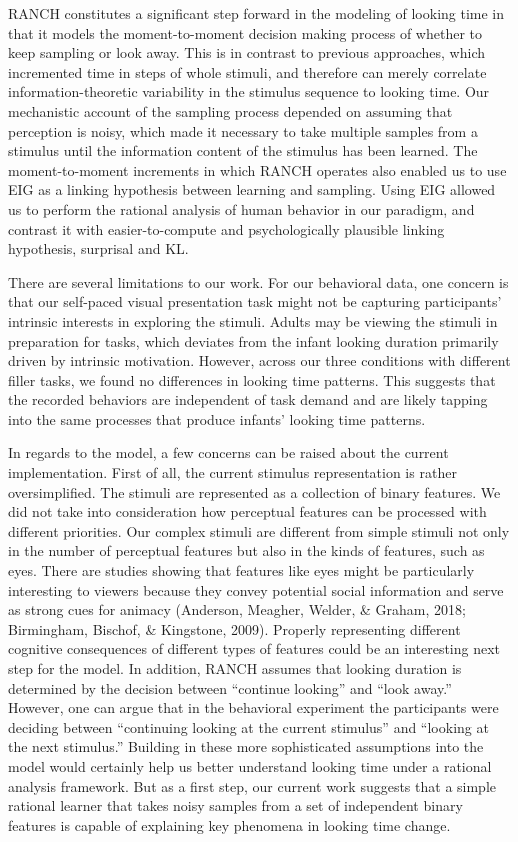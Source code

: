 \documentclass[10pt, letterpaper]{article}
\begin{document}
RANCH constitutes a significant step forward in the modeling of looking
time in that it models the moment-to-moment decision making process of
whether to keep sampling or look away. This is in contrast to previous
approaches, which incremented time in steps of whole stimuli, and
therefore can merely correlate information-theoretic variability in the
stimulus sequence to looking time. Our mechanistic account of the
sampling process depended on assuming that perception is noisy, which
made it necessary to take multiple samples from a stimulus until the
information content of the stimulus has been learned. The
moment-to-moment increments in which RANCH operates also enabled us to
use EIG as a linking hypothesis between learning and sampling. Using EIG
allowed us to perform the rational analysis of human behavior in our
paradigm, and contrast it with easier-to-compute and psychologically
plausible linking hypothesis, surprisal and KL.

There are several limitations to our work. For our behavioral data, one
concern is that our self-paced visual presentation task might not be
capturing participants' intrinsic interests in exploring the stimuli.
Adults may be viewing the stimuli in preparation for tasks, which
deviates from the infant looking duration primarily driven by intrinsic
motivation. However, across our three conditions with different filler
tasks, we found no differences in looking time patterns. This suggests
that the recorded behaviors are independent of task demand and are
likely tapping into the same processes that produce infants' looking
time patterns.

In regards to the model, a few concerns can be raised about the current
implementation. First of all, the current stimulus representation is
rather oversimplified. The stimuli are represented as a collection of
binary features. We did not take into consideration how perceptual
features can be processed with different priorities. Our complex stimuli
are different from simple stimuli not only in the number of perceptual
features but also in the kinds of features, such as eyes. There are
studies showing that features like eyes might be particularly
interesting to viewers because they convey potential social information
and serve as strong cues for animacy (Anderson, Meagher, Welder, \&
Graham, 2018; Birmingham, Bischof, \& Kingstone, 2009). Properly
representing different cognitive consequences of different types of
features could be an interesting next step for the model. In addition,
RANCH assumes that looking duration is determined by the decision
between ``continue looking'' and ``look away.'' However, one can argue
that in the behavioral experiment the participants were deciding between
``continuing looking at the current stimulus'' and ``looking at the next
stimulus.'' Building in these more sophisticated assumptions into the
model would certainly help us better understand looking time under a
rational analysis framework. But as a first step, our current work
suggests that a simple rational learner that takes noisy samples from a
set of independent binary features is capable of explaining key
phenomena in looking time change.
\end{document}
